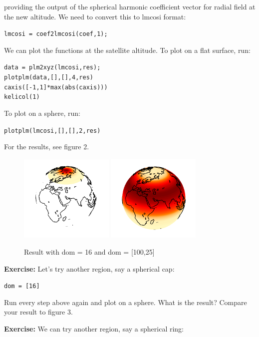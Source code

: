 \documentclass[11pt]{article}
\begin{document}
providing the output of the spherical harmonic coefficient vector for radial field at the new altitude.  We need to convert this to lmcosi format:

\verb+lmcosi = coef2lmcosi(coef,1);+

We can plot the functions at the satellite altitude.  To plot on a flat surface, run:

\verb+data = plm2xyz(lmcosi,res);+\\
\verb+plotplm(data,[],[],4,res)+\\
\verb+caxis([-1,1]*max(abs(caxis)))+\\
\verb+kelicol(1)+

To plot on a sphere, run:

\verb+plotplm(lmcosi,[],[],2,res)+

For the results, see figure 2.

\begin{figure}
  \centering
  \includegraphics[width=0.4\textwidth]{figures/dom16.png}
  \includegraphics[width=0.4\textwidth]{figures/dom100_25.png}
  \caption{Result with dom = 16 and dom = [100,25]}
\label{dom}
\end{figure}

\textbf{Exercise:} Let's try another region, say a spherical cap:

\verb+dom = [16]+

Run every step above again and plot on a sphere.  What is the result?  Compare your result to figure 3.


\textbf{Exercise:} We can try another region, say a spherical ring:
\end{document}

